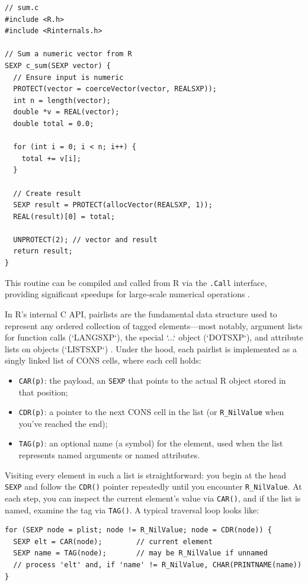 \begin{verbatim}
// sum.c
#include <R.h>
#include <Rinternals.h>

// Sum a numeric vector from R
SEXP c_sum(SEXP vector) {
  // Ensure input is numeric
  PROTECT(vector = coerceVector(vector, REALSXP));
  int n = length(vector);
  double *v = REAL(vector);
  double total = 0.0;

  for (int i = 0; i < n; i++) {
    total += v[i];
  }

  // Create result
  SEXP result = PROTECT(allocVector(REALSXP, 1));
  REAL(result)[0] = total;

  UNPROTECT(2); // vector and result
  return result;
}
\end{verbatim}

This routine can be compiled and called from R via the \texttt{.Call} interface, providing significant speedups for large-scale numerical operations \cite{R-base}.

In R’s internal C API, pairlists are the fundamental data structure used to represent any ordered collection of tagged elements—most notably, argument lists for function calls (`LANGSXP`), the special `...` object (`DOTSXP`), and attribute lists on objects (`LISTSXP`) \cite{wickham_pairlists}.  Under the hood, each pairlist is implemented as a singly linked list of CONS cells, where each cell holds:

\begin{itemize}
  \item \texttt{CAR(p)}: the payload, an \texttt{SEXP} that points to the actual R object stored in that position;
  \item \texttt{CDR(p)}: a pointer to the next CONS cell in the list (or \texttt{R\_NilValue} when you’ve reached the end);
  \item \texttt{TAG(p)}: an optional name (a symbol) for the element, used when the list represents named arguments or named attributes.
\end{itemize}

Visiting every element in such a list is straightforward: you begin at the head \texttt{SEXP} and follow the \texttt{CDR()} pointer repeatedly until you encounter \texttt{R\_NilValue}.  At each step, you can inspect the current element’s value via \texttt{CAR()}, and if the list is named, examine the tag via \texttt{TAG()}.  A typical traversal loop looks like:

\begin{verbatim}
for (SEXP node = plist; node != R_NilValue; node = CDR(node)) {
  SEXP elt = CAR(node);        // current element
  SEXP name = TAG(node);       // may be R_NilValue if unnamed
  // process 'elt' and, if 'name' != R_NilValue, CHAR(PRINTNAME(name))
}
\end{verbatim}


